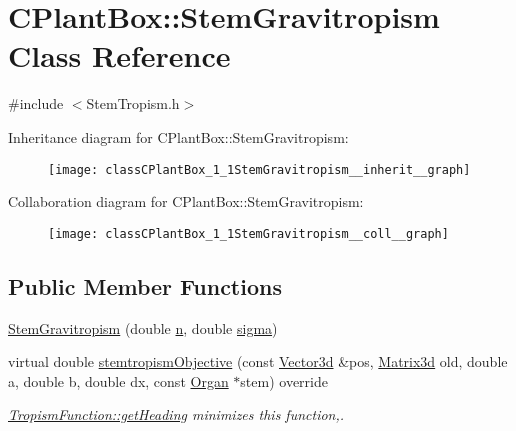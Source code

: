 \hypertarget{classCPlantBox_1_1StemGravitropism}{}\section{C\+Plant\+Box\+:\+:Stem\+Gravitropism Class Reference}
\label{classCPlantBox_1_1StemGravitropism}


{\ttfamily \#include $<$Stem\+Tropism.\+h$>$}



Inheritance diagram for C\+Plant\+Box\+:\+:Stem\+Gravitropism\+:\nopagebreak
\begin{figure}[H]
\begin{center}
\leavevmode
\texttt{[image: classCPlantBox\_1\_1StemGravitropism\_\_inherit\_\_graph]}
\end{center}
\end{figure}


Collaboration diagram for C\+Plant\+Box\+:\+:Stem\+Gravitropism\+:\nopagebreak
\begin{figure}[H]
\begin{center}
\leavevmode
\texttt{[image: classCPlantBox\_1\_1StemGravitropism\_\_coll\_\_graph]}
\end{center}
\end{figure}
\subsection*{Public Member Functions}
\begin{DoxyCompactItemize}
\item 
\hyperlink{classCPlantBox_1_1StemGravitropism_a68879922d071610b1c969025d169ba8b}{Stem\+Gravitropism} (double \hyperlink{classCPlantBox_1_1StemTropismFunction_a54ebffbb66feb026ce61d57f17d4d25a}{n}, double \hyperlink{classCPlantBox_1_1StemTropismFunction_a79ea448c44b07fb59d85e9d130190994}{sigma})
\item 
virtual double \hyperlink{classCPlantBox_1_1StemGravitropism_a1b49d50328982c6ce20b9c9c22efb764}{stemtropism\+Objective} (const \hyperlink{classCPlantBox_1_1Vector3d}{Vector3d} \&pos, \hyperlink{classCPlantBox_1_1Matrix3d}{Matrix3d} old, double a, double b, double dx, const \hyperlink{classCPlantBox_1_1Organ}{Organ} $\ast$stem) override
\begin{DoxyCompactList}\small\item\em \hyperlink{classCPlantBox_1_1TropismFunction_adb52b88734a94fe1365a00e02c7e6be5}{Tropism\+Function\+::get\+Heading} minimizes this function,. \end{DoxyCompactList}\end{DoxyCompactItemize}
